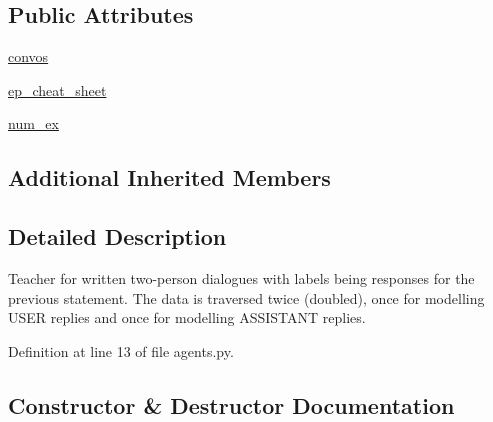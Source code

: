 \subsection*{Public Attributes}
\begin{DoxyCompactItemize}
\item 
\hyperlink{classparlai_1_1tasks_1_1taskmaster_1_1agents_1_1SelfDialogueTeacher_a6a5215f1c64623de6962a32b95f27fac}{convos}
\item 
\hyperlink{classparlai_1_1tasks_1_1taskmaster_1_1agents_1_1SelfDialogueTeacher_ac8110082f9ce0736ff129f93cf7740c1}{ep\+\_\+cheat\+\_\+sheet}
\item 
\hyperlink{classparlai_1_1tasks_1_1taskmaster_1_1agents_1_1SelfDialogueTeacher_a8a3fced952427353aba96b59a8efe0d2}{num\+\_\+ex}
\end{DoxyCompactItemize}
\subsection*{Additional Inherited Members}


\subsection{Detailed Description}
\begin{DoxyVerb}Teacher for written two-person dialogues with labels being responses for
the previous statement. The data is traversed twice (doubled), once for
modelling USER replies and once for modelling ASSISTANT replies.
\end{DoxyVerb}
 

Definition at line 13 of file agents.\+py.



\subsection{Constructor \& Destructor Documentation}
\mbox{\label{classparlai_1_1tasks_1_1taskmaster_1_1agents_1_1SelfDialogueTeacher_a32491a46f580811d074f1a2566793fc4}} 
